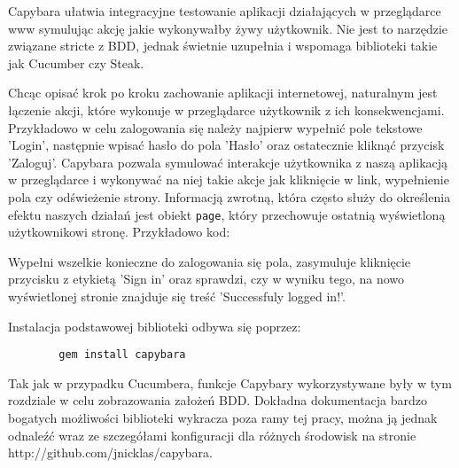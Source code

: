       Capybara ułatwia integracyjne testowanie aplikacji działających w przeglądarce www symulując akcję jakie wykonywałby żywy użytkownik. Nie jest to narzędzie związane stricte z BDD, jednak świetnie uzupełnia i wspomaga biblioteki takie jak Cucumber czy Steak.
      
      Chcąc opisać krok po kroku zachowanie aplikacji internetowej, naturalnym jest łączenie akcji, które wykonuje w przeglądarce użytkownik z ich konsekwencjami. Przykładowo w celu zalogowania się należy najpierw wypełnić pole tekstowe 'Login', następnie wpisać hasło do pola 'Hasło' oraz ostatecznie kliknąć przycisk 'Zaloguj'. Capybara pozwala symulować interakcje użytkownika z naszą aplikacją w przeglądarce i wykonywać na niej takie akcje jak kliknięcie w link, wypełnienie pola czy odświeżenie strony.
      Informacją zwrotną, która często służy do określenia efektu naszych działań jest obiekt \verb+page+, który przechowuje ostatnią wyświetloną użytkownikowi stronę. Przykładowo kod:
      
      
      
      Wypełni wszelkie konieczne do zalogowania się pola, zasymuluje kliknięcie przycisku z etykietą 'Sign in' oraz sprawdzi, czy w wyniku tego, na nowo wyświetlonej stronie znajduje się treść 'Successfuly logged in!'.
      
      Instalacja podstawowej biblioteki odbywa się poprzez:
      
      \begin{lstlisting}
        gem install capybara
      \end{lstlisting}
      
      Tak jak w przypadku Cucumbera, funkcje Capybary wykorzystywane były w tym rozdziale w celu zobrazowania założeń BDD. Dokładna dokumentacja bardzo bogatych możliwości biblioteki wykracza poza ramy tej pracy, można ją jednak odnaleźć wraz ze szczegółami konfiguracji dla różnych środowisk na stronie http://github.com/jnicklas/capybara.
      